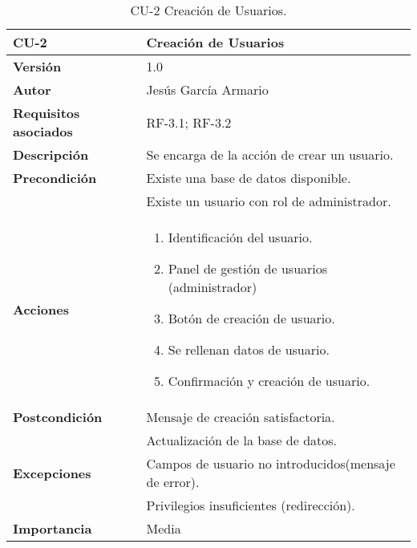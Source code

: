 \begin{table}[p]
	\centering
	\begin{tabularx}{\linewidth}{ p{} p{} }
		\toprule
		\textbf{CU-2}    & \textbf{Creación de Usuarios}\\
		\toprule
		\textbf{Versión}              & 1.0    \\
		\textbf{Autor}                & Jesús García Armario \\
		\textbf{Requisitos asociados} & RF-3.1; RF-3.2 \\
		\textbf{Descripción}          & Se encarga de la acción de crear un usuario. \\
		\textbf{Precondición}         & Existe una base de datos disponible. \\
  & Existe un usuario con rol de administrador.\\
		\textbf{Acciones}             &
		\begin{enumerate}
			\def\labelenumi{\arabic{enumi}.}
			\tightlist
			\item Identificación del usuario.
   \item Panel de gestión de usuarios (administrador)
   \item Botón de creación de usuario.
   \item Se rellenan datos de usuario.

  \item 		Confirmación y creación de usuario.\end{enumerate}\\
		\textbf{Postcondición}        &  Mensaje de creación satisfactoria. \\
  & Actualización de la base de datos.\\
		\textbf{Excepciones}          & Campos de usuario no introducidos(mensaje de error).\\
  & Privilegios insuficientes (redirección).\\
		\textbf{Importancia}          & Media \\
		\bottomrule
	\end{tabularx}
	\caption{CU-2 Creación de Usuarios.}
 \end{table}

